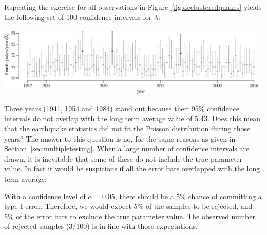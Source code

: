 Repeating the exercise for all observations in
Figure~\ref{fig:declusteredquakes} yields the following set of 100
confidence intervals for $\lambda$:\medskip

\noindent\includegraphics[]{../figures/poiserrbars.pdf}
\begingroup {}
\endgroup

Three years (1941, 1954 and 1984) stand out because their 95\%
confidence intervals do not overlap with the long term average value
of 5.43. Does this mean that the earthquake statistics did not fit the
Poisson distribution during those years? The answer to this question
is no, for the same reasons as given in
Section~\ref{sec:multipletesting}. When a large number of confidence
intervals are drawn, it is inevitable that some of these do not
include the true parameter value. In fact it would be suspicious if
all the error bars overlapped with the long term average.\medskip

With a confidence level of $\alpha=0.05$, there should be a 5\%
chance of committing a type-I error.  Therefore, we would expect 5\%
of the samples to be rejected, and 5\% of the error bars to exclude
the true parameter value. The observed number of rejected samples
(3/100) is in line with those expectations.

